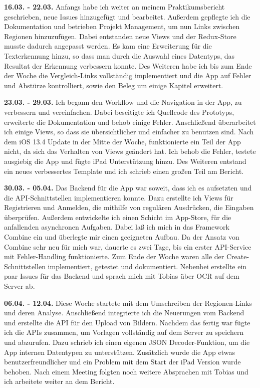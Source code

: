 \documentclass[nomenclature, oneside, 150]{HSMW-Thesis}
\begin{document}
	\textbf{16.03. - 22.03.} 
	Anfangs habe ich weiter an meinem Praktikumsbericht geschrieben, neue Issues hinzugefügt und bearbeitet. Außerdem gepflegte ich die Dokumentation und betrieben Projekt Management, um nun Links zwischen Regionen hinzuzufügen. Dabei entstanden neue Views und der Redux-Store musste dadurch angepasst werden. Es kam eine Erweiterung für die Texterkennung hinzu, so dass man durch die Auswahl eines Datentyps, das Resultat der Erkennung verbessern konnte. Des Weiteren habe ich bis zum Ende der Woche die Vergleich-Links vollständig implementiert und die App auf Fehler und Abstürze kontrolliert, sowie den Beleg um einige Kapitel erweitert.
	
	\textbf{23.03. - 29.03.} 
	Ich begann den Workflow und die Navigation in der App, zu verbessern und vereinfachen. Dabei beseitigte ich Quellcode des Prototyps, erweiterte die Dokumentation und behob einige Fehler. Anschließend überarbeitet ich einige Views, so dass sie übersichtlicher und einfacher zu benutzen sind. Nach dem iOS 13.4 Update in der Mitte der Woche, funktionierte ein Teil der App nicht, da sich das Verhalten von Views geändert hat. Ich behob die Fehler, testete ausgiebig die App und fügte iPad Unterstützung hinzu. Des Weiteren entstand ein neues verbessertes Template und ich schrieb einen großen Teil am Bericht.
	
	\textbf{30.03. - 05.04.} 
	Das Backend für die App war soweit, dass ich es aufsetzten und die API-Schnittstellen implementieren konnte. Dazu erstellte ich Views für Registrieren und Anmelden, die mithilfe von regulären Ausdrücken, die Eingaben überprüfen. Außerdem entwickelte ich einen Schicht im App-Store, für die anfallenden asynchronen Aufgaben. Dabei laß ich mich in das Framework Combine ein und überlegte mir einen geeigneten Aufbau. Da der Ansatz von Combine sehr neu für mich war, dauerte es zwei Tage, bis ein erster API-Service mit Fehler-Handling funktionierte. Zum Ende der Woche waren alle der Create-Schnittstellen implementiert, getestet und dokumentiert. Nebenbei erstellte ein paar Issues für das Backend und sprach mich mit Tobias über OCR auf dem Server ab.
	
	\textbf{06.04. - 12.04.}
	Diese Woche startete mit dem Umschreiben der Regionen-Links und deren Analyse. Anschließend integrierte ich die Neuerungen vom Backend und erstellte die API für den Upload von Bildern. Nachdem das fertig war fügte ich die APIs zusammen, um Vorlagen vollständig auf dem Server zu speichern und abzurufen. Dazu schrieb ich einen eigenen JSON Decoder-Funktion, um die App internen Datentypen zu unterstützen. Zusätzlich wurde die App etwas benutzerfreundlicher und ein Problem mit dem Start der iPad Version wurde behoben. Nach einem Meeting folgten noch weitere Absprachen mit Tobias und ich arbeitete weiter an dem Bericht.
	
\end{document}

